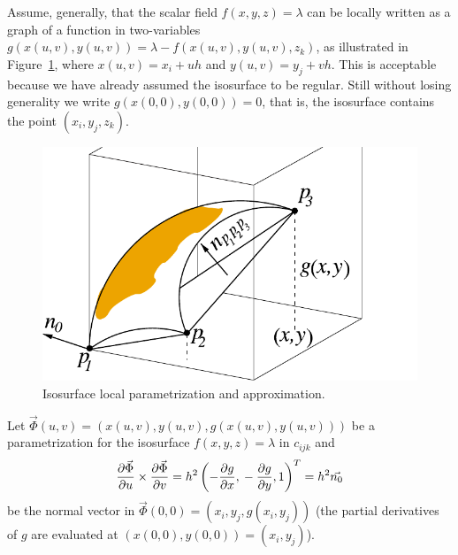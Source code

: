 Assume, generally, that the scalar field $f(x,y,z)=\lambda$ can be
locally written as a graph of a function in two-variables
$g(x(u,v),y(u,v))=\lambda-f(x(u,v),y(u,v),z_k)$, as illustrated in
Figure~\ref{fig:graphfunct}, where $x(u,v) = x_i+uh$ and
$y(u,v)=y_j+vh$. This is acceptable because we have already assumed
the isosurface to be regular. Still without losing generality we
write $g(x(0,0),y(0,0)) = 0$, that is, the isosurface
contains the point $(x_i,y_j,z_k)$.
\begin{figure}[b]
  \centering
  \includegraphics[width=0.40\linewidth,keepaspectratio=true]{chapter2/figures/gridcell.pdf}
  \caption{Isosurface local parametrization and approximation.}
  \label{fig:graphfunct}
\end{figure}
 Let  $\vec{\Phi}(u,v) = (x(u,v),y(u,v),g(x(u,v),y(u,v)))$ be a parametrization 
for the isosurface $f(x,y,z)=\lambda$ in $c_{ijk}$ and
\begin{equation}
\frac{\partial\vec{\Phi}}{\partial u}\times\frac{\partial\vec{\Phi}}{\partial v} = 
h^2\left(-\frac{\partial g}{\partial x},\\
	     -\frac{\partial g}{\partial y},\\ 
	     1\right)^T = h^2 \vec{n_0}
\label{eq:normal_exact}
\end{equation}
\noindent be the normal vector in $\vec{\Phi}(0,0)=(x_i,y_j,g(x_i,y_j))$ 
(the partial derivatives of $g$ are evaluated at $(x(0,0),y(0,0))=(x_i,y_j)$).

